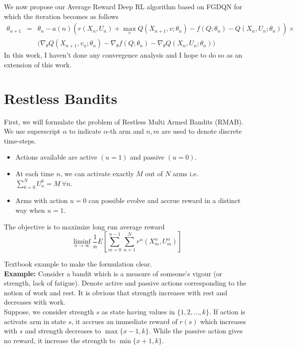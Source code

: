 \documentclass{article}
\theoremstyle{definition}
\begin{document}
We now propose our Average Reward Deep RL algorithm based on FGDQN for which the iteration becomes as follows 
\begin{eqnarray}
\label{eqn:fgdqnavg}
\theta_{n+1} &=& \theta_n - a(n)\left(r(X_n,U_n) +\max_v Q(X_{n+1}, v; \theta_n) -f(Q;\theta_n) - Q(X_n, U_n;\theta_n)\right)\times \nonumber \\
&& \Big(\nabla_\theta Q(X_{n+1}, v_n; \theta_n) - \nabla_\theta f(Q;\theta_n) - \nabla_\theta Q(X_n, U_n; \theta_n)\Big)
\end{eqnarray}
In this work, I haven't done any convergence analysis and I hope to do so as an extension of this work.



\section{Restless Bandits}
First, we will formulate the problem of Restless Multi Armed Bandits (RMAB). We use superscript $\alpha$ to indicate $\alpha$-th arm and $n, m$ are used to denote discrete time-steps.
\begin{itemize}
    \item Actions available are active $(u = 1)$ and passive $(u = 0)$.
    \item At each time $n$, we can activate exactly $M$ out of $N$ arms i.e. $\sum_{k=0}^N U_n^k = M \ \forall n$.
    \item Arms with action $u=0$ can possible evolve and accrue reward in a distinct way when $u=1$. 
\end{itemize}
The objective is to maximize long run average reward 
\begin{equation}
\label{eqn:wobj}
\liminf_{n\rightarrow\infty}\frac{1}{n}E\left[\sum_{m=0}^{n-1}\sum_{\alpha=1}^Nr^\alpha(X^\alpha_m, U^\alpha_m)\right]
\end{equation}

Textbook example to make the formulation clear. \\
\textbf{Example:} Consider a bandit which is a measure of someone's vigour (or strength, lack of fatigue). Denote active and passive actions corresponding to the notion of work and rest. It is obvious that strength increases with rest and decreases with work. \\
Suppose, we consider strength $s$ as state having values in $\{1,2,\dotsc,k\}$. If action is activate arm in state $s$, it accrues an immediate reward of $r(s)$ which increases with $s$ and strength decreases to $\max\{x-1,k\}$. While the passive action gives no reward, it increase the strength to $\min\{x+1,k\}$.
 
\end{document}
